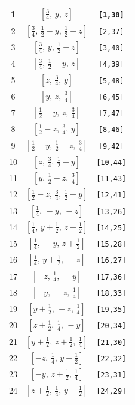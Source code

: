 \documentclass[fleqn,8pt]{jsarticle}
\begin{document}
\begin{longtable}{ccc}
1 & $\left[ \frac{3}{4},\, y,\, z \right]$ & {\tt [1,38]} \\ \hline
2 & $\left[ \frac{3}{4},\, \frac{1}{2} - y,\, \frac{1}{2} - z \right]$ & {\tt [2,37]} \\ \hline
3 & $\left[ \frac{3}{4},\, y,\, \frac{1}{2} - z \right]$ & {\tt [3,40]} \\ \hline
4 & $\left[ \frac{3}{4},\, \frac{1}{2} - y,\, z \right]$ & {\tt [4,39]} \\ \hline
5 & $\left[ z,\, \frac{3}{4},\, y \right]$ & {\tt [5,48]} \\ \hline
6 & $\left[ y,\, z,\, \frac{3}{4} \right]$ & {\tt [6,45]} \\ \hline
7 & $\left[ \frac{1}{2} - y,\, z,\, \frac{3}{4} \right]$ & {\tt [7,47]} \\ \hline
8 & $\left[ \frac{1}{2} - z,\, \frac{3}{4},\, y \right]$ & {\tt [8,46]} \\ \hline
9 & $\left[ \frac{1}{2} - y,\, \frac{1}{2} - z,\, \frac{3}{4} \right]$ & {\tt [9,42]} \\ \hline
10 & $\left[ z,\, \frac{3}{4},\, \frac{1}{2} - y \right]$ & {\tt [10,44]} \\ \hline
11 & $\left[ y,\, \frac{1}{2} - z,\, \frac{3}{4} \right]$ & {\tt [11,43]} \\ \hline
12 & $\left[ \frac{1}{2} - z,\, \frac{3}{4},\, \frac{1}{2} - y \right]$ & {\tt [12,41]} \\ \hline
13 & $\left[ \frac{1}{4},\, - y,\, - z \right]$ & {\tt [13,26]} \\ \hline
14 & $\left[ \frac{1}{4},\, y + \frac{1}{2},\, z + \frac{1}{2} \right]$ & {\tt [14,25]} \\ \hline
15 & $\left[ \frac{1}{4},\, - y,\, z + \frac{1}{2} \right]$ & {\tt [15,28]} \\ \hline
16 & $\left[ \frac{1}{4},\, y + \frac{1}{2},\, - z \right]$ & {\tt [16,27]} \\ \hline
17 & $\left[ - z,\, \frac{1}{4},\, - y \right]$ & {\tt [17,36]} \\ \hline
18 & $\left[ - y,\, - z,\, \frac{1}{4} \right]$ & {\tt [18,33]} \\ \hline
19 & $\left[ y + \frac{1}{2},\, - z,\, \frac{1}{4} \right]$ & {\tt [19,35]} \\ \hline
20 & $\left[ z + \frac{1}{2},\, \frac{1}{4},\, - y \right]$ & {\tt [20,34]} \\ \hline
21 & $\left[ y + \frac{1}{2},\, z + \frac{1}{2},\, \frac{1}{4} \right]$ & {\tt [21,30]} \\ \hline
22 & $\left[ - z,\, \frac{1}{4},\, y + \frac{1}{2} \right]$ & {\tt [22,32]} \\ \hline
23 & $\left[ - y,\, z + \frac{1}{2},\, \frac{1}{4} \right]$ & {\tt [23,31]} \\ \hline
24 & $\left[ z + \frac{1}{2},\, \frac{1}{4},\, y + \frac{1}{2} \right]$ & {\tt [24,29]} \\
\end{longtable}
\end{document}
